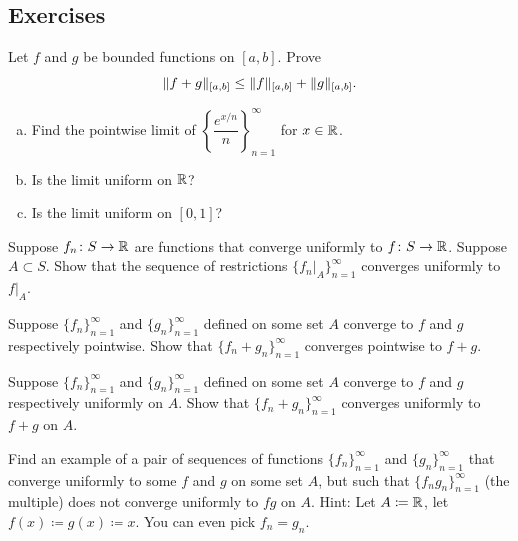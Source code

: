 \subsection{Exercises}

\begin{exercise}
Let $f$ and $g$ be bounded functions on $[a,b]$.  Prove 
\begin{equation*}
\lVert {f+g} \rVert_{[a,b]} \leq \lVert {f} \rVert_{[a,b]} + \lVert {g} \rVert_{[a,b]} .
\end{equation*}
\end{exercise}

\begin{exercise}
\leavevmode
\begin{enumerate}[a)]
\item
Find the pointwise limit of
$\left\{ \dfrac{e^{x/n}}{n} \right\}_{n=1}^\infty$ for $x \in {\mathbb{R}}$.
\item
Is the limit uniform on ${\mathbb{R}}$?
\item
Is the limit uniform on $[0,1]$?
\end{enumerate}
\end{exercise}

\begin{exercise}
Suppose $f_n \colon S \to {\mathbb{R}}$ are functions that converge uniformly
to $f \colon S \to {\mathbb{R}}$.  Suppose $A \subset S$.  Show that
the sequence of restrictions $\{ f_n|_A \}_{n=1}^\infty$ converges uniformly to $f|_A$.
\end{exercise}

\begin{exercise}
Suppose $\{ f_n \}_{n=1}^\infty$ and $\{ g_n \}_{n=1}^\infty$ defined on some set $A$ converge to
$f$ and $g$ respectively pointwise.  Show that $\{ f_n+g_n \}_{n=1}^\infty$ converges
pointwise to $f+g$.
\end{exercise}

\begin{exercise}
Suppose $\{ f_n \}_{n=1}^\infty$ and $\{ g_n \}_{n=1}^\infty$ defined on some set $A$ converge to
$f$ and $g$ respectively uniformly on $A$.
Show that $\{ f_n+g_n \}_{n=1}^\infty$
converges uniformly to $f+g$ on $A$.
\end{exercise}

\begin{exercise}
Find an example of a pair of sequences of functions $\{ f_n \}_{n=1}^\infty$ and
$\{ g_n \}_{n=1}^\infty$
that converge uniformly to some $f$ and $g$ on some set $A$, but such that
$\{ f_ng_n \}_{n=1}^\infty$ (the multiple) does not converge uniformly to $fg$ on $A$.
Hint: Let $A \coloneqq {\mathbb{R}}$, let $f(x)\coloneqq g(x) \coloneqq x$.  You can even pick $f_n = g_n$.
\end{exercise}

